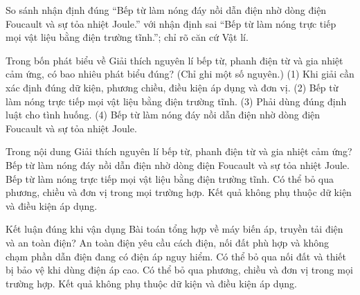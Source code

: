 \begin{bt}
So sánh nhận định đúng “Bếp từ làm nóng đáy nồi dẫn điện nhờ dòng điện Foucault và sự tỏa nhiệt Joule.” với nhận định sai “Bếp từ làm nóng trực tiếp mọi vật liệu bằng điện trường tĩnh.”; chỉ rõ căn cứ Vật lí.
\end{bt}

\begin{ex}
Trong bốn phát biểu về Giải thích nguyên lí bếp từ, phanh điện từ và gia nhiệt cảm ứng, có bao nhiêu phát biểu đúng? (Chỉ ghi một số nguyên.) (1) Khi giải cần xác định đúng dữ kiện, phương chiều, điều kiện áp dụng và đơn vị. (2) Bếp từ làm nóng trực tiếp mọi vật liệu bằng điện trường tĩnh. (3) Phải dùng đúng định luật cho tình huống. (4) Bếp từ làm nóng đáy nồi dẫn điện nhờ dòng điện Foucault và sự tỏa nhiệt Joule.
\end{ex}

\begin{ex}
Trong nội dung Giải thích nguyên lí bếp từ, phanh điện từ và gia nhiệt cảm ứng?
\choice
{\True Bếp từ làm nóng đáy nồi dẫn điện nhờ dòng điện Foucault và sự tỏa nhiệt Joule.}
{Bếp từ làm nóng trực tiếp mọi vật liệu bằng điện trường tĩnh.}
{Có thể bỏ qua phương, chiều và đơn vị trong mọi trường hợp.}
{Kết quả không phụ thuộc dữ kiện và điều kiện áp dụng.}
\end{ex}

\begin{ex}
Kết luận đúng khi vận dụng Bài toán tổng hợp về máy biến áp, truyền tải điện và an toàn điện?
\choice
{\True An toàn điện yêu cầu cách điện, nối đất phù hợp và không chạm phần dẫn điện đang có điện áp nguy hiểm.}
{Có thể bỏ qua nối đất và thiết bị bảo vệ khi dùng điện áp cao.}
{Có thể bỏ qua phương, chiều và đơn vị trong mọi trường hợp.}
{Kết quả không phụ thuộc dữ kiện và điều kiện áp dụng.}
\end{ex}

